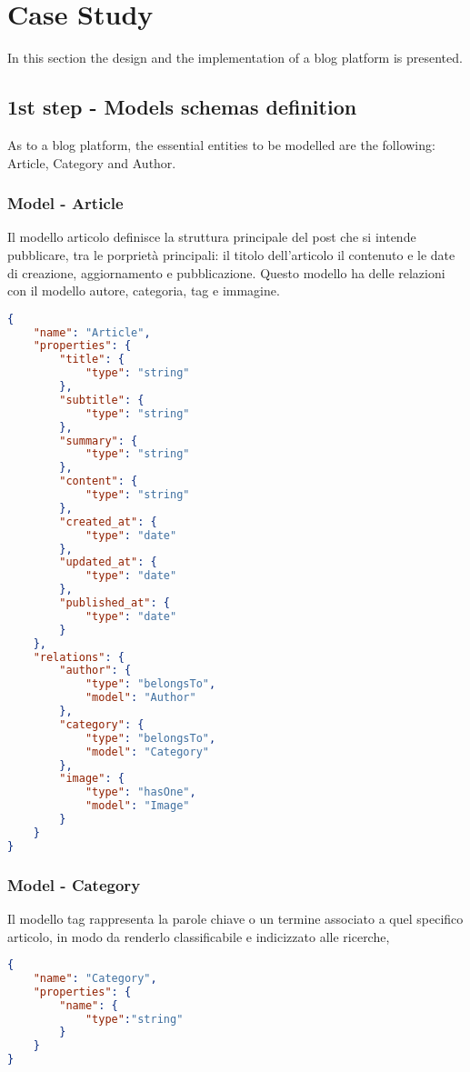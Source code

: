 \section{Case Study}
\label{sec:CAS_castudy}

In this section the design and the implementation of a blog platform is presented.

\subsection{1st step - Models schemas definition}

As to a blog platform, the essential entities to be modelled are the following: Article, Category and Author.

\subsubsection{Model - Article}

Il modello articolo definisce la struttura principale del post che si intende pubblicare, tra le porprietà principali: il titolo dell'articolo il contenuto e le date di  creazione, aggiornamento e pubblicazione. Questo modello ha delle relazioni con il modello autore, categoria, tag e immagine.

\begin{lstlisting}[language=json]
{
	"name": "Article",
	"properties": {
		"title": {
      		"type": "string"
    	},
    	"subtitle": {
      		"type": "string"
    	},
    	"summary": {
      		"type": "string"
    	},
    	"content": {
      		"type": "string"
    	},
    	"created_at": {
      		"type": "date"
    	},
    	"updated_at": {
      		"type": "date"
    	},
    	"published_at": {
      		"type": "date"
    	}
  	},
	"relations": {
    	"author": {
      		"type": "belongsTo",
      		"model": "Author"
    	},
    	"category": {
      		"type": "belongsTo",
      		"model": "Category"
    	},
    	"image": {
      		"type": "hasOne",
      		"model": "Image"
    	}
    }
}
\end{lstlisting}
\subsubsection{Model - Category}

Il modello tag rappresenta la parole chiave o un termine associato a quel specifico articolo, in modo da renderlo classificabile e indicizzato alle ricerche,

\begin{lstlisting}[language=json]
{
	"name": "Category",
	"properties": {
		"name": {
			"type":"string"
		}
	}
}
\end{lstlisting}
